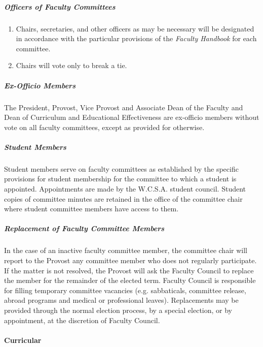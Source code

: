 \documentclass[letterpaper, 11pt]{article}
\begin{document}
				\subparagraph{Officers of Faculty Committees}
					\begin{enumerate}[label=\alph*)]
						\item{Chairs, secretaries, and other officers as may be necessary will be designated in accordance with the particular provisions of the \emph{Faculty Handbook} for each committee.}
						\item{Chairs will vote only to break a tie.}
					\end{enumerate}
				\subparagraph{Ex-Officio Members}
					The President, Provost, Vice Provost and Associate Dean of the Faculty and Dean of Curriculum and Educational Effectiveness are ex-officio members without vote on all faculty committees, except as provided for otherwise.
				\subparagraph{Student Members}
					Student members serve on faculty committees as established by the specific provisions for student membership for the committee to which a student is appointed. Appointments are made by the W.C.S.A. student council.  Student copies of committee minutes are retained in the office of the committee chair where student committee members have access to them.
				\subparagraph{Replacement of Faculty Committee Members}

					In the case of an inactive faculty committee member, the committee chair will report to the Provost any committee member who does not regularly participate.  If the matter is not resolved, the Provost will ask the Faculty Council to replace the member for the remainder of the elected term.
					Faculty Council is responsible for filling temporary committee vacancies (e.g. sabbaticals, committee release, abroad programs and medical or professional leaves).  Replacements may be provided through the normal election process, by a special election, or by appointment, at the discretion of Faculty Council.
			\paragraph{Curricular}
\end{document}

